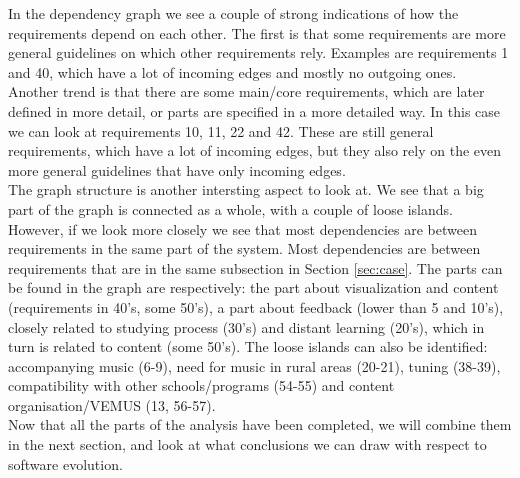 \documentclass[a4paper,11pt]{article}
\begin{document}
		In the dependency graph we see a couple of strong indications of how the requirements depend on each other. The first is that some requirements are more general guidelines on which other requirements rely. Examples are requirements 1 and 40, which have a lot of incoming edges and mostly no outgoing ones. \\
		Another trend is that there are some main/core requirements, which are later defined in more detail, or parts are specified in a more detailed way. In this case we can look at requirements 10, 11, 22 and 42. These are still general requirements, which have a lot of incoming edges, but they also rely on the even more general guidelines that have only incoming edges. \\
		The graph structure is another intersting aspect to look at. We see that a big part of the graph is connected as a whole, with a couple of loose islands. However, if we look more closely we see that most dependencies are between requirements in the same part of the system. Most dependencies are between requirements that are in the same subsection in Section \ref{sec:case}. The parts can be found in the graph are respectively: the part about visualization and content (requirements in 40's, some 50's), a part about feedback (lower than 5 and 10's), closely related to studying process (30's) and distant learning (20's), which in turn is related to content (some 50's). The loose islands can also be identified: accompanying music (6-9), need for music in rural areas (20-21), tuning (38-39), compatibility with other schools/programs (54-55) and content organisation/VEMUS (13, 56-57). \\
		Now that all the parts of the analysis have been completed, we will combine them in the next section, and look at what conclusions we can draw with respect to software evolution.
\end{document}
